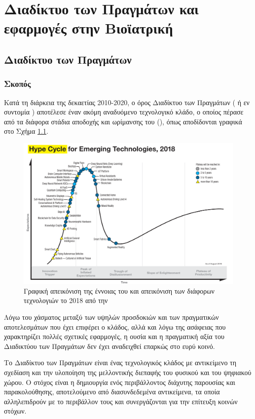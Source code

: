 \chapter{Διαδίκτυο των Πραγμάτων και εφαρμογές στην Βιοϊατρική}
\label{chap1}
\section{Διαδίκτυο των Πραγμάτων}
\subsection{Σκοπός}
Κατά τη διάρκεια της δεκαετίας 2010-2020, ο όρος Διαδίκτυο των Πραγμάτων ( ή εν συντομία ) αποτέλεσε έναν ακόμη αναδυόμενο τεχνολογικό κλάδο, ο οποίος πέρασε από τα διάφορα στάδια αποδοχής και ωρίμανσης του (), όπως αποδίδονται γραφικά στο Σχήμα \ref{hc}.
\begin{figure}[h!]
\includegraphics[scale=0.3]{images/hype_cycle.png}
\centering
\caption{Γραφική απεικόνιση της έννοιας του  και απεικόνιση των διάφορων τεχνολογιών το 2018 από την  \cite{Gartner:HC}}	
\label{hc}
\end{figure}
Λόγω του χάσματος μεταξύ των υψηλών προσδοκιών και των πραγματικών αποτελεσμάτων που έχει επιφέρει ο κλάδος, αλλά και λόγω της ασάφειας που χαρακτηρίζει πολλές σχετικές εφαρμογές, η ουσία και η πραγματική αξία του Διαδικτύου των Πραγμάτων δεν έχει αναδειχθεί επαρκώς στο ευρύ κοινό.
\par
Το Διαδίκτυο των Πραγμάτων είναι ένας τεχνολογικός κλάδος με αντικείμενο τη σχεδίαση και την υλοποίηση της μελλοντικής διεπαφής του φυσικού και του ψηφιακού χώρου.
Ο στόχος είναι η δημιουργία ενός περιβάλλοντος διάχυτης παρουσίας και παρακολούθησης, αποτελούμενο από διασυνδεδεμένα αντικείμενα, τα οποία αλληλεπιδρούν με το περιβάλλον τους και συνεργάζονται για την επίτευξη κοινών στόχων. \cite{book:giusto}
